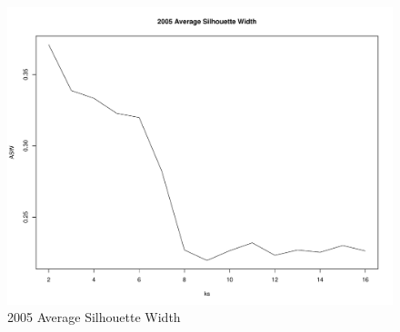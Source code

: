 \documentclass{article}
\begin{document}
    \begin{center}
        \begin{figure}
            \includegraphics[scale=0.4]{./images/2005-sil-width.pdf}
            \caption{2005 Average Silhouette Width}
            \label{fig:7}
        \end{figure}
    \end{center}
\end{document}
